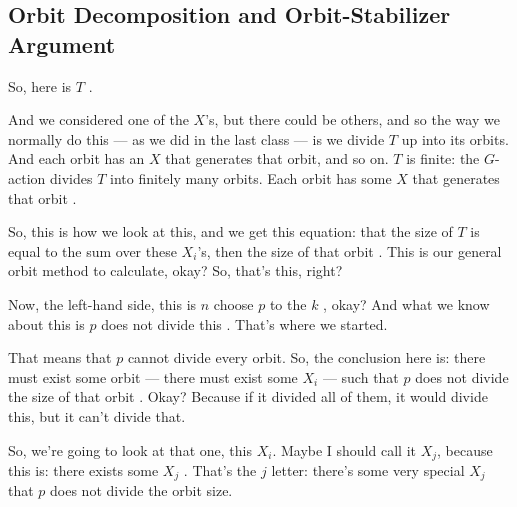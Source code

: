 \begin{proofWrapper}
\subsection{Orbit Decomposition and Orbit-Stabilizer Argument}

\begin{speech}[00:11:48 - 00:13:59]
So, here is $T$ .

And we considered one of the $X$'s, but there could be others, and so the way we normally do this --- as we did in the last class --- is we divide $T$ up into its orbits. And each orbit has an $X$ that generates that orbit, and so on. $T$ is finite: the $G$-action divides $T$ into finitely many orbits. Each orbit has some $X$ that generates that orbit .

So, this is how we look at this, and we get this equation: that the size of $T$ is equal to the sum over these $X_i$'s, then the size of that orbit . This is our general orbit method to calculate, okay? So, that's this, right?

Now, the left-hand side, this is $n$ choose $p$ to the $k$ , okay? And what we know about this is $p$ does not divide this . That's where we started.

That means that $p$ cannot divide every orbit. So, the conclusion here is: there must exist some orbit --- there must exist some $X_i$ --- such that $p$ does not divide the size of that orbit . Okay? Because if it divided all of them, it would divide this, but it can't divide that.

So, we're going to look at that one, this $X_i$. Maybe I should call it $X_j$, because this is: there exists some $X_j$ . That's the $j$ letter: there's some very special $X_j$ that $p$ does not divide the orbit size.
\end{speech}


\end{proofWrapper}
